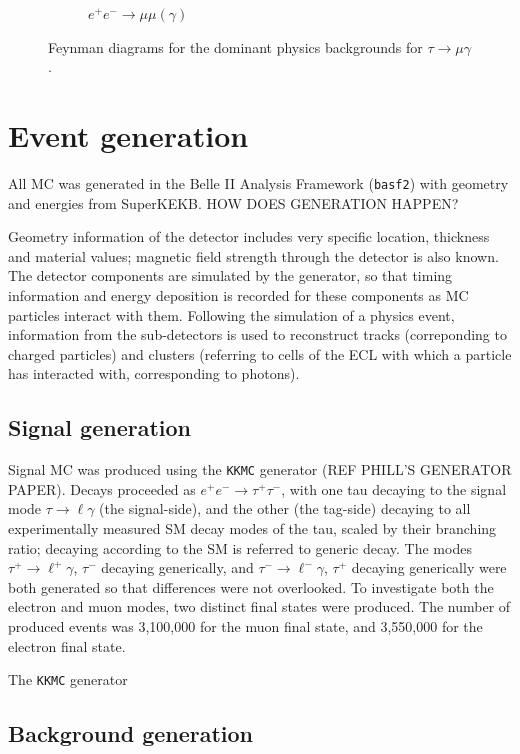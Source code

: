 \documentclass[12pt]{thesis}  %
\newcommand{\tmg}{\tau\to\mu\gamma}
\begin{document}
\begin{figure}[h]
\begin{subfigure}[b]{0.315\textwidth}
            \caption[]%
            {{\small $e^+ e^- \to \mu \mu (\gamma)$}}    
            \label{fig:mean and std of net24}
        \end{subfigure}
        \caption{Feynman diagrams for the dominant physics backgrounds for $\tmg$.}
    \end{figure}


\section{Event generation}

All MC was generated in the Belle II Analysis Framework (\texttt{basf2}) with geometry and energies from SuperKEKB. HOW DOES GENERATION HAPPEN? 

Geometry information of the detector includes very specific location, thickness and material values; magnetic field strength through the detector is also known. The detector components are simulated by the generator, so that timing information and energy deposition is recorded for these components as MC particles interact with them. Following the simulation of a physics event, information from the sub-detectors is used to reconstruct tracks (correponding to charged particles) and clusters (referring to cells of the ECL with which a particle has interacted with, corresponding to photons).

\subsection{Signal generation}

Signal MC was produced using the \texttt{KKMC} generator (REF PHILL'S GENERATOR PAPER). Decays proceeded as $e^+ e^- \to \tau^+ \tau^-$, with one tau decaying to the signal mode $\tau \to \ell \gamma$ (the signal-side), and the other (the tag-side) decaying to all experimentally measured SM decay modes of the tau, scaled by their branching ratio; decaying according to the SM is referred to generic decay. The modes $\tau^+ \to \ell^+ \gamma$, $\tau^-$ decaying generically, and $\tau^- \to \ell^- \gamma$, $\tau^+$ decaying generically were both generated so that differences were not overlooked. To investigate both the electron and muon modes, two distinct final states were produced. The number of produced events was 3,100,000 for the muon final state, and 3,550,000 for the electron final state.

The \texttt{KKMC} generator


\subsection{Background generation}
\end{document}
